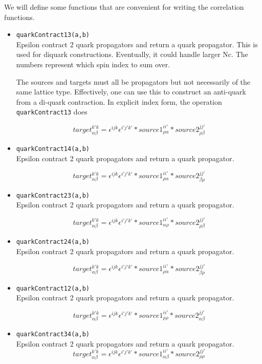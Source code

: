 \documentclass[12pt]{article}
\begin{document}
We will define some functions that are convenient for writing the correlation
functions.
%
\begin{itemize}
\item
\verb|quarkContract13(a,b)|\\
Epsilon contract 2 quark propagators and return a quark propagator.
This is used for diquark constructions. Eventually, it could handle larger
Nc. 
The numbers represent which spin index to sum over.
   
The sources and targets must all be propagators but not
necessarily of the same lattice type. Effectively, one can use
this to construct an anti-quark from a di-quark contraction. In
explicit index form, the operation  \verb|quarkContract13| does

\[
target^{k' k}_{\alpha\beta} =
 \epsilon^{i j k}\epsilon^{i' j' k'}* source1^{i i'}_{\rho\alpha}* source2^{j j'}_{\rho\beta}
\]

\item
\verb|quarkContract14(a,b)|\\
Epsilon contract 2 quark propagators and return a quark propagator.
   
\[
target^{k' k}_{\alpha\beta} =
    \epsilon^{i j k}\epsilon^{i' j' k'}*source1^{i i'}_{\rho\alpha}*source2^{j j'}_{\beta\rho}
\]

\item
\verb|quarkContract23(a,b)|\\
Epsilon contract 2 quark propagators and return a quark propagator.
   
\[
target^{k' k}_{\alpha\beta} =
    \epsilon^{i j k}\epsilon^{i' j' k'}*source1^{i i'}_{\alpha\rho}*source2^{j j'}_{\rho\beta}\]

\item
\verb|quarkContract24(a,b)|\\
Epsilon contract 2 quark propagators and return a quark propagator.
   
\[
target^{k' k}_{\alpha\beta} =
    \epsilon^{i j k}\epsilon^{i' j' k'}*source1^{i i'}_{\rho\alpha}*source2^{j j'}_{\beta\rho}
\]

\item
\verb|quarkContract12(a,b)|\\
Epsilon contract 2 quark propagators and return a quark propagator.

\[target^{k' k}_{\alpha\beta} =
    \epsilon^{i j k}\epsilon^{i' j' k'}*source1^{i i'}_{\rho\rho}*source2^{j j'}_{\alpha\beta}
\]

\item
\verb|quarkContract34(a,b)|\\
Epsilon contract 2 quark propagators and return a quark propagator.
\[target^{k' k}_{\alpha\beta} =
    \epsilon^{i j k}\epsilon^{i' j' k'}*source1^{i i'}_{\alpha\beta}*source2^{j j'}_{\rho\rho}\]


\end{itemize}
\end{document}
